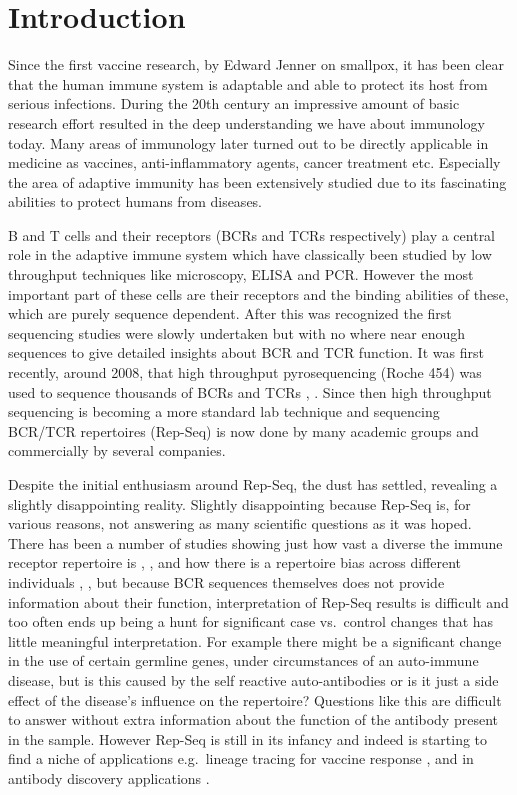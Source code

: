 \chapter{Introduction}
Since the first vaccine research, by Edward Jenner on smallpox, it has been clear that the human immune system is adaptable and able to protect its host from serious infections.
During the 20th century an impressive amount of basic research effort resulted in the deep understanding we have about immunology today.
Many areas of immunology later turned out to be directly applicable in medicine as vaccines, anti-inflammatory agents, cancer treatment etc.
Especially the area of adaptive immunity has been extensively studied due to its fascinating abilities to protect humans from diseases.

B and T cells and their receptors (BCRs and TCRs respectively) play a central role in the adaptive immune system which have classically been studied by low throughput techniques like microscopy, ELISA and PCR.
However the most important part of these cells are their receptors and the binding abilities of these, which are purely sequence dependent.
After this was recognized the first sequencing studies were slowly undertaken but with no where near enough sequences to give detailed insights about BCR and TCR function.
It was first recently, around 2008, that high throughput pyrosequencing (Roche 454) was used to sequence thousands of BCRs and TCRs \cite{campbell2008subclonal}, \cite{boyd2008high}.
Since then high throughput sequencing is becoming a more standard lab technique and sequencing BCR/TCR repertoires (Rep-Seq) is now done by many academic groups and commercially by several companies.

Despite the initial enthusiasm around Rep-Seq, the dust has settled, revealing a slightly disappointing reality.
Slightly disappointing because Rep-Seq is, for various reasons, not answering as many scientific questions as it was hoped.
There has been a number of studies showing just how vast a diverse the immune receptor repertoire is \cite{zhang20173d}, \cite{elhanati2015inferring}, and how there is a repertoire bias across different individuals \cite{dewitt2016public}, \cite{vander2017dysregulation}, but because BCR sequences themselves does not provide information about their function, interpretation of Rep-Seq results is difficult and too often ends up being a hunt for significant case vs.\ control changes that has little meaningful interpretation.
For example there might be a significant change in the use of certain germline genes, under circumstances of an auto-immune disease, but is this caused by the self reactive auto-antibodies or is it just a side effect of the disease's influence on the repertoire?
Questions like this are difficult to answer without extra information about the function of the antibody present in the sample.
However Rep-Seq is still in its infancy and indeed is starting to find a niche of applications e.g.\ lineage tracing for vaccine response \cite{Doria-Rose2014-vi}, \cite{Wu2011-yj} and in antibody discovery applications \cite{reddy2010monoclonal}.

